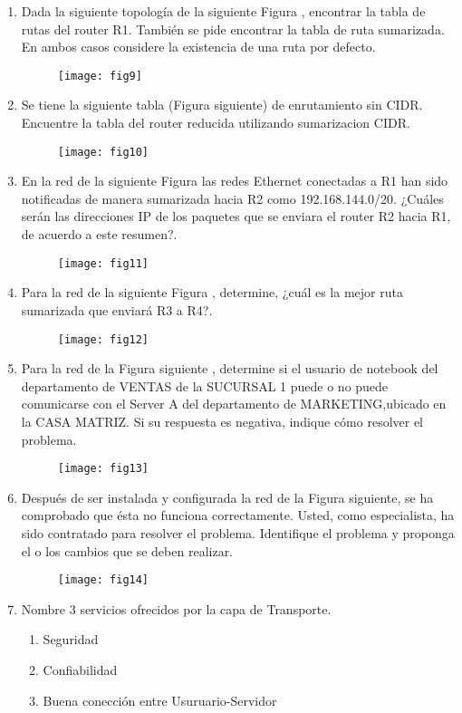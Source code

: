 \documentclass{udparticle}
\begin{document}
\begin{enumerate}
\begin{figure}[H]
	\end{figure}
\item Dada la siguiente topología de la siguiente Figura , encontrar la tabla de rutas 
del router R1. También se pide encontrar la tabla de ruta sumarizada. En 
ambos casos considere la existencia de una ruta por defecto.
	\begin{figure}[H]
	\centering
	\texttt{[image: fig9]}
	\end{figure}
\item Se tiene la siguiente tabla (Figura siguiente) de enrutamiento sin CIDR. Encuentre 
la tabla del router reducida utilizando sumarizacion CIDR.
	\begin{figure}[H]
	\centering
	\texttt{[image: fig10]}
	\end{figure}
\item En la red de la siguiente Figura  las redes Ethernet conectadas a R1 han sido 
notificadas de manera sumarizada hacia R2 como 192.168.144.0/20. ¿Cuáles serán 
las direcciones IP de los paquetes que se enviara el router R2 hacia R1, de acuerdo a este resumen?.
	\begin{figure}[H]
	\centering
	\texttt{[image: fig11]}

	\end{figure}
\item Para la red de la siguiente Figura , determine, ¿cuál es la mejor ruta sumarizada que
enviará R3 a R4?.
	\begin{figure}[H]
	\centering
	\texttt{[image: fig12]}
	\end{figure}

\item Para la red de la Figura siguiente , determine si el usuario de notebook del 
departamento de VENTAS de la SUCURSAL 1 puede o no puede comunicarse con el Server 
A del departamento de MARKETING,ubicado en la CASA MATRIZ. Si su respuesta es 
negativa, indique cómo resolver el problema.
	\begin{figure}[H]
	\centering
	\texttt{[image: fig13]}
	\end{figure}

\item Después de ser instalada y configurada la red de la Figura siguiente, se ha 
comprobado que ésta no funciona correctamente. Usted, como especialista, ha sido 
contratado para resolver el problema. Identifique el problema y proponga el o los 
cambios que se deben realizar.
	\begin{figure}[H]
	\centering
	\texttt{[image: fig14]}
	\end{figure}
\item Nombre 3 servicios ofrecidos por la capa de Transporte.
\begin{enumerate}
\item Seguridad 
\item Confiabilidad
\item Buena conección entre Usuruario-Servidor
\end{enumerate}
\end{enumerate}
\end{document}

